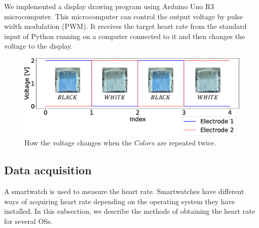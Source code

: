 \documentclass[sigchi,authordraft]{acmart}
\begin{document}
We implemented a display drawing program using Arduino Uno R3 microcomputer. This microcomputer can control the output voltage by pulse width modulation (PWM). It receives the target heart rate from the standard input of Python running on a computer connected to it and then changes the voltage to the display.

\begin{figure}[!t]
  \centering
  \includegraphics[width=1\linewidth]{figures/voltage_wave.eps}
  \caption{How the voltage changes when the $Colors$ are repeated twice.}
  \label{fig:colors_flexible}
\end{figure}


\subsection{Data acquisition}
\label{subsec:data_acquisition}
A smartwatch is used to measure the heart rate. Smartwatches have different ways of acquiring heart rate depending on the operating system they have installed. In this subsection, we describe the methods of obtaining the heart rate for several OSs.

\end{document}
